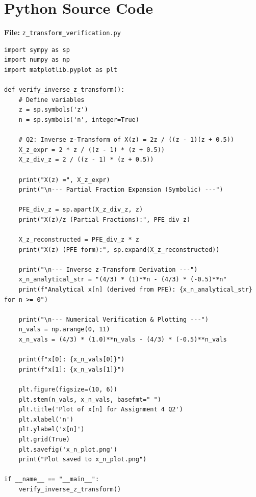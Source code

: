 \documentclass[11pt, a4paper]{article}
\begin{document}
\section{Python Source Code}
\textbf{File:} \texttt{z\_transform\_verification.py}
\begin{lstlisting}[caption={Z-Transform Verification via Partial Fractions -- Assignment 4}]
import sympy as sp
import numpy as np
import matplotlib.pyplot as plt

def verify_inverse_z_transform():
    # Define variables
    z = sp.symbols('z')
    n = sp.symbols('n', integer=True)
    
    # Q2: Inverse z-Transform of X(z) = 2z / ((z - 1)(z + 0.5))
    X_z_expr = 2 * z / ((z - 1) * (z + 0.5))
    X_z_div_z = 2 / ((z - 1) * (z + 0.5))
    
    print("X(z) =", X_z_expr)
    print("\n--- Partial Fraction Expansion (Symbolic) ---")
    
    PFE_div_z = sp.apart(X_z_div_z, z)
    print("X(z)/z (Partial Fractions):", PFE_div_z)
    
    X_z_reconstructed = PFE_div_z * z
    print("X(z) (PFE form):", sp.expand(X_z_reconstructed))
    
    print("\n--- Inverse z-Transform Derivation ---")
    x_n_analytical_str = "(4/3) * (1)**n - (4/3) * (-0.5)**n"
    print(f"Analytical x[n] (derived from PFE): {x_n_analytical_str} for n >= 0")
    
    print("\n--- Numerical Verification & Plotting ---")
    n_vals = np.arange(0, 11)
    x_n_vals = (4/3) * (1.0)**n_vals - (4/3) * (-0.5)**n_vals
    
    print(f"x[0]: {x_n_vals[0]}")
    print(f"x[1]: {x_n_vals[1]}")
    
    plt.figure(figsize=(10, 6))
    plt.stem(n_vals, x_n_vals, basefmt=" ")
    plt.title('Plot of x[n] for Assignment 4 Q2')
    plt.xlabel('n')
    plt.ylabel('x[n]')
    plt.grid(True)
    plt.savefig('x_n_plot.png')
    print("Plot saved to x_n_plot.png")

if __name__ == "__main__":
    verify_inverse_z_transform()
\end{lstlisting}
\end{document}
